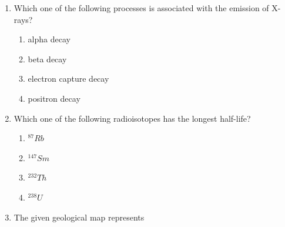 \documentclass[journal,12pt,onecolumn]{IEEEtran}
\begin{document}
\begin{enumerate}
\hfill{}
\begin{multicols}{4}
\begin{enumerate}
    \item (111)
    \item (524)
    \item (425)
    \item (542)
\end{enumerate}
\end{multicols}

\item Which one of the following processes is associated with the emission of X-rays?

\hfill{}
\begin{multicols}{2}
\begin{enumerate}
    \item alpha decay
    \item beta decay
    \item electron capture decay
    \item positron decay
\end{enumerate}
\end{multicols}

\item Which one of the following radioisotopes has the longest half-life?

\hfill{}
\begin{multicols}{4}
\begin{enumerate}
    \item $^{87}Rb$
    \item $^{147}Sm$
    \item $^{232}Th$
    \item $^{238}U$
\end{enumerate}
\end{multicols}

\item The given geological map represents


\end{enumerate}
\end{document}
